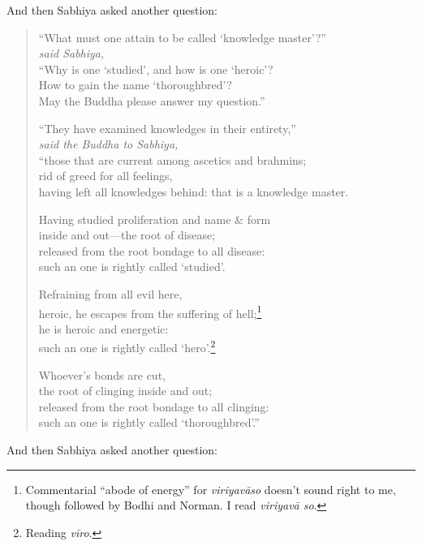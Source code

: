 \documentclass[12pt,openany]{book}%
\newcommand*{\scspeaker}[1]{\hspace{2em}\textit{#1}}
\begin{document}
And then Sabhiya asked another question: 

\begin{verse}%
“What must one attain to be called ‘knowledge master’?” \\
\scspeaker{said Sabhiya, }\\
“Why is one ‘studied’, and how is one ‘heroic’? \\
How to gain the name ‘thoroughbred’? \\
May the Buddha please answer my question.” 

“They have examined knowledges in their entirety,” \\
\scspeaker{said the Buddha to Sabhiya, }\\
“those that are current among ascetics and brahmins; \\
rid of greed for all feelings, \\
having left all knowledges behind: that is a knowledge master. 

Having studied proliferation and name \& form \\
inside and out—the root of disease; \\
released from the root bondage to all disease: \\
such an one is rightly called ‘studied’. 

Refraining from all evil here, \\
heroic, he escapes from the suffering of hell;\footnote{Commentarial “abode of energy” for \textit{\textsanskrit{viriyavāso}} doesn’t sound right to me, though followed by Bodhi and Norman. I read \textit{\textsanskrit{viriyavā} so}. } \\
he is heroic and energetic: \\
such an one is rightly called ‘hero’.\footnote{Reading \textit{\textsanskrit{vīro}}. } 

Whoever’s bonds are cut, \\
the root of clinging inside and out; \\
released from the root bondage to all clinging: \\
such an one is rightly called ‘thoroughbred’.” 

%
\end{verse}

And then Sabhiya asked another question: 
\end{document}
